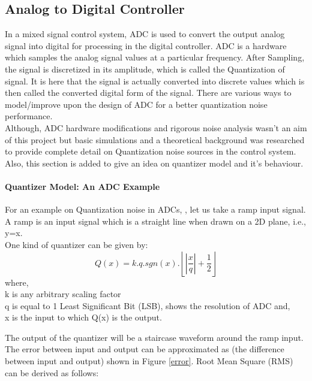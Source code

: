 \documentclass[colorlinks=true,pdfstartview=FitV,linkcolor=blue,
            citecolor=red,urlcolor=magenta]{ligodoc}
\begin{document}
	\subsection{Analog to Digital Controller}
	In a mixed signal control system, ADC is used to convert the output analog signal into digital for processing in the digital controller. ADC is a hardware which samples the analog signal values at a particular frequency. After Sampling, the signal is discretized in its amplitude, which is called the Quantization of signal. It is here that the signal is actually converted into discrete values which is then called the converted digital form of the signal. There are various ways to model/improve upon the design of ADC for a better quantization noise performance. \\
	
	Although, ADC hardware modifications and rigorous noise analysis wasn't an aim of this project but basic simulations and a theoretical background was researched to provide complete detail on Quantization noise sources in the control system. Also, this section is added to give an idea on quantizer model and it's behaviour. \\
	\paragraph{Quantizer Model: An ADC Example}
 	For an example on Quantization noise in ADCs, \cite{Quantization}, let us take a ramp input signal. A ramp is an input signal which is a straight line when drawn on a 2D plane, i.e., y=x.\\
One kind of quantizer can be given by:
\begin{equation}
Q(x)=k.q.sgn(x).\left\lfloor\left|\frac{x}{q}\right|+\frac{1}{2}\right\rfloor
\end{equation}
 where,\\ k is any arbitrary scaling factor\\
 q is equal to 1 Least Significant Bit (LSB), shows the resolution of ADC
 and, \\
 x is the input to which Q(x) is the output.
 
   
The output of the quantizer will be a staircase waveform around the ramp input. 
% 
%		
The error between input and output can be approximated as (the difference between input and output) shown in Figure \ref{error}. Root Mean Square (RMS) can be derived as follows:
\end{document}
